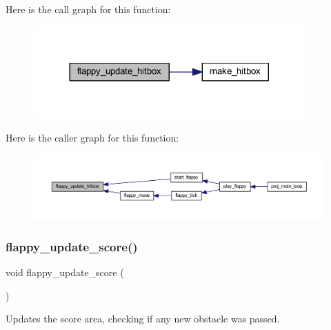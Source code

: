 Here is the call graph for this function\+:\nopagebreak
\begin{figure}[H]
\begin{center}
\leavevmode
\includegraphics[width=296pt]{group__flappy_ga890241c4d6c50c4a9a15c9b3ac9d0c1a_cgraph}
\end{center}
\end{figure}
Here is the caller graph for this function\+:\nopagebreak
\begin{figure}[H]
\begin{center}
\leavevmode
\includegraphics[width=350pt]{group__flappy_ga890241c4d6c50c4a9a15c9b3ac9d0c1a_icgraph}
\end{center}
\end{figure}
\mbox{\label{group__flappy_gaa49e826d675bb2a5271332a23831fcd1}} 
\subsubsection{\texorpdfstring{flappy\+\_\+update\+\_\+score()}{flappy\_update\_score()}}
{\footnotesize\ttfamily void flappy\+\_\+update\+\_\+score (\begin{DoxyParamCaption}{ }\end{DoxyParamCaption})}



Updates the score area, checking if any new obstacle was passed. 

